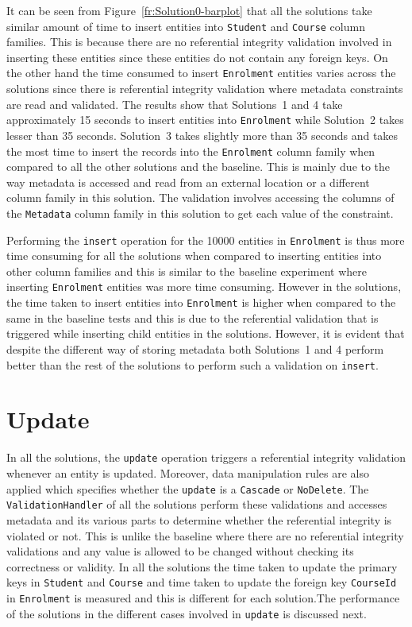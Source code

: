 It can be seen from Figure~\ref{fr:Solution0-barplot} that all the solutions take
similar amount of time to insert entities into \texttt{Student} and
\texttt{Course} column families. This is because there are no referential
integrity validation involved in inserting these entities since these entities
do not contain any foreign keys. On the other hand the time consumed to insert
\texttt{Enrolment} entities varies across the solutions since there is
referential integrity validation where metadata constraints are read and
validated.
The results show that Solutions~1 and 4 take approximately 15 seconds to insert
entities into \texttt{Enrolment} while Solution~2 takes lesser than 35 seconds. Solution~3
takes slightly more than 35 seconds and takes the most time to insert the
records into the \texttt{Enrolment} column family when compared to all the other
solutions and the baseline. This is mainly due to the way metadata is accessed
and read from an external location or a different column family in this
solution. The validation involves accessing the  columns of the
\texttt{Metadata} column family in this solution to get each value of the
constraint.
		
Performing the \texttt{insert} operation for the 10000 entities in
\texttt{Enrolment} is thus more time consuming for all the solutions when
compared to inserting entities into other column families and this is similar to
the baseline experiment where inserting \texttt{Enrolment} entities was more
time consuming.
However in the solutions, the time taken to insert entities into
\texttt{Enrolment} is higher when compared to the same in the baseline tests and
this is  due to the referential validation that is triggered while inserting
child entities in the solutions. However, it is evident that despite the
different way of storing metadata both Solutions~1 and 4 perform better than the
rest of the solutions to perform such a validation on \texttt{insert}.


\section{Update}\label{sr:update}
In all the solutions, the \texttt{update} operation triggers a referential
integrity validation whenever an entity is updated. Moreover, data manipulation
rules are also applied which specifies whether the \texttt{update} is a
\texttt{Cascade} or \texttt{NoDelete}. The \texttt{ValidationHandler} of all the
solutions perform these validations and accesses metadata and its various parts
to determine whether the referential integrity is violated or not. This is
unlike the baseline where there are no referential integrity validations and any
value is allowed to be changed without checking its correctness or validity. In
all the solutions the time taken to update the primary keys in \texttt{Student}
and \texttt{Course} and time taken to update the foreign key \texttt{CourseId}
in \texttt{Enrolment} is measured and this is different for each solution.The
performance of the solutions in the different cases involved in \texttt{update}
is discussed next.


